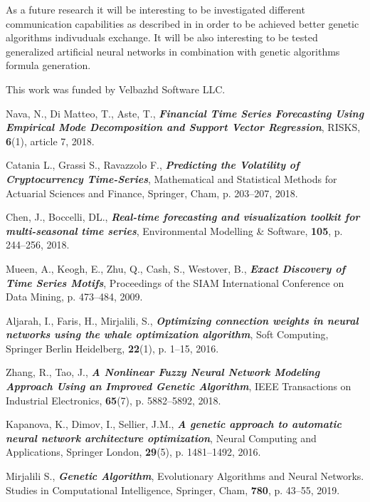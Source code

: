 \documentclass[graybox]{svmult}
\begin{document}
As a future research it will be interesting to be investigated different communication capabilities as described in \cite{alexandrov01} in order to be achieved better genetic algorithms indivuduals exchange. It will be also interesting to be tested generalized artificial neural networks \cite{tashev01} in combination with genetic algorithms formula generation.

\begin{acknowledgement}
This work was funded by Velbazhd Software LLC.
\end{acknowledgement}


\begin{thebibliography}{99}


 Nava, N., Di Matteo, T., Aste, T., \textbf{\textit{Financial Time Series Forecasting Using Empirical Mode Decomposition and Support Vector Regression}}, RISKS, \textbf{6}(1), article 7, 2018.

 Catania L., Grassi S., Ravazzolo F., \textbf{\textit{Predicting the Volatility of Cryptocurrency Time-Series}}, Mathematical and Statistical Methods for Actuarial Sciences and Finance, Springer, Cham, p. 203--207, 2018.

 Chen, J., Boccelli, DL., \textbf{\textit{Real-time forecasting and visualization toolkit for multi-seasonal time series}}, Environmental Modelling \& Software, \textbf{105}, p. 244--256, 2018.

 Mueen, A., Keogh, E., Zhu, Q., Cash, S., Westover, B., \textbf{\textit{Exact Discovery of Time Series Motifs}}, Proceedings of the SIAM International Conference on Data Mining, p. 473--484, 2009.

 Aljarah, I., Faris, H., Mirjalili, S., \textbf{\textit{Optimizing connection weights in neural networks using the whale optimization algorithm}}, Soft Computing, Springer Berlin Heidelberg, \textbf{22}(1), p. 1--15, 2016.

 Zhang, R., Tao, J., \textbf{\textit{A Nonlinear Fuzzy Neural Network Modeling Approach Using an Improved Genetic Algorithm}}, IEEE Transactions on Industrial Electronics, \textbf{65}(7), p. 5882--5892, 2018.

 Kapanova, K., Dimov, I., Sellier, J.M., \textbf{\textit{A genetic approach to automatic neural network architecture optimization}}, Neural Computing and Applications, Springer London, \textbf{29}(5), p. 1481--1492, 2016.

 Mirjalili S., \textbf{\textit{Genetic Algorithm}}, Evolutionary Algorithms and Neural Networks. Studies in Computational Intelligence, Springer, Cham, \textbf{780}, p. 43--55, 2019.


\end{thebibliography}
\end{document}
